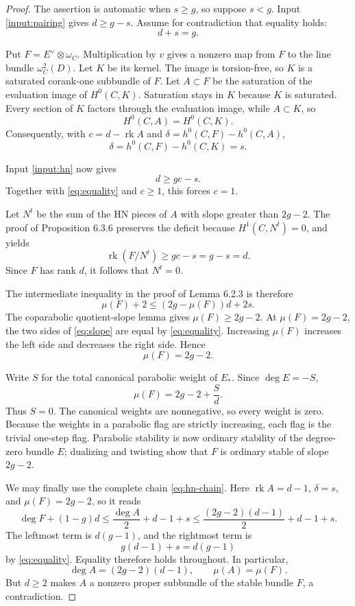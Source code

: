\documentclass[11pt]{article}
\theoremstyle{definition}
\newcommand{\rk}{\operatorname{rk}}
\begin{document}
\begin{proof}
The assertion is automatic when $s\ge g$, so suppose $s<g$.  Input
\ref{input:pairing} gives $d\ge g-s$.  Assume for contradiction that
equality holds:
\begin{equation}
 d+s=g.
 \label{eq:equality}
\end{equation}

Put $F=E^\vee\otimes\omega_C$.  Multiplication by $v$ gives a nonzero map
from $F$ to the line bundle $\omega_C^2(D)$.  Let $K$ be its kernel.  The
image is torsion-free, so $K$ is a saturated corank-one subbundle of $F$.
Let $A\subset F$ be the saturation of the evaluation image of $H^0(C,K)$.
Saturation stays in $K$ because $K$ is saturated.  Every section of $K$
factors through the evaluation image, while $A\subset K$, so
\[
 H^0(C,A)=H^0(C,K).
\]
Consequently, with $c=d-\rk A$ and
$\delta=h^0(C,F)-h^0(C,A)$,
\[
 \delta=h^0(C,F)-h^0(C,K)=s.
\]

Input \ref{input:hn} now gives
\[
 d\ge gc-s.
\]
Together with \eqref{eq:equality} and $c\ge1$, this forces $c=1$.

Let $N^t$ be the sum of the HN pieces of $A$ with slope greater than
$2g-2$.  The proof of Proposition 6.3.6 preserves the deficit because
$H^1(C,N^t)=0$, and yields
\[
 \rk(F/N^t)\ge gc-s=g-s=d.
\]
Since $F$ has rank $d$, it follows that $N^t=0$.

The intermediate inequality in the proof of Lemma 6.2.3 is therefore
\begin{equation}
 \mu(F)+2\le (2g-\mu(F))d+2s.
 \label{eq:slope}
\end{equation}
The coparabolic quotient-slope lemma gives $\mu(F)\ge2g-2$.  At
$\mu(F)=2g-2$, the two sides of \eqref{eq:slope} are equal by
\eqref{eq:equality}.  Increasing $\mu(F)$ increases the left side and
decreases the right side.  Hence
\[
 \mu(F)=2g-2.
\]

Write $S$ for the total canonical parabolic weight of $E_*$.  Since
$\deg E=-S$,
\[
 \mu(F)=2g-2+\frac{S}{d}.
\]
Thus $S=0$.  The canonical weights are nonnegative, so every weight is zero.
Because the weights in a parabolic flag are strictly increasing, each flag
is the trivial one-step flag.  Parabolic stability is now ordinary
stability of the degree-zero bundle $E$; dualizing and twisting show that
$F$ is ordinary stable of slope $2g-2$.

We may finally use the complete chain \eqref{eq:hn-chain}.  Here
$\rk A=d-1$, $\delta=s$, and $\mu(F)=2g-2$, so it reads
\[
 \deg F+(1-g)d
 \le \frac{\deg A}{2}+d-1+s
 \le \frac{(2g-2)(d-1)}2+d-1+s.
\]
The leftmost term is $d(g-1)$, and the rightmost term is
\[
 g(d-1)+s=d(g-1)
\]
by \eqref{eq:equality}.  Equality therefore holds throughout.  In
particular,
\[
 \deg A=(2g-2)(d-1),
 \qquad \mu(A)=\mu(F).
\]
But $d\ge2$ makes $A$ a nonzero proper subbundle of the stable bundle $F$,
a contradiction.
\end{proof}
\end{document}
